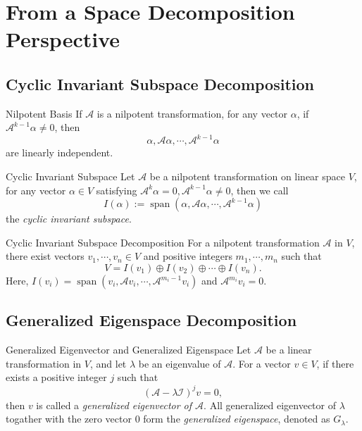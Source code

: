 

\section{From a Space Decomposition Perspective}

\subsection{Cyclic Invariant Subspace Decomposition}

\begin{lemma}{Nilpotent Basis}{}
  If $\mathcal{A}$ is a nilpotent transformation,
  for any vector $\alpha$,
  if $\mathcal{A}^{k-1} \alpha \neq 0$,
  then
  \begin{equation}
    \alpha, \mathcal{A}\alpha,\cdots,\mathcal{A}^{k-1}\alpha
  \end{equation}
  are linearly independent.
\end{lemma}

\begin{definition}{Cyclic Invariant Subspace}{}
  Let $\mathcal{A}$ be a nilpotent transformation on linear space $V$,
  for any vector $\alpha \in V$ satisfying $\mathcal{A}^k \alpha = 0,
  \mathcal{A}^{k-1}\alpha \neq 0$,
  then we call
  \begin{equation}
    I(\alpha) := \operatorname{span}(\alpha, \mathcal{A}\alpha, \cdots, \mathcal{A}^{k-1}\alpha)
  \end{equation}
  the \emph{cyclic invariant subspace}.
\end{definition}

\begin{theorem}{Cyclic Invariant Subspace Decomposition}{}
  For a nilpotent transformation $\mathcal{A}$ in $V$,
  there exist vectors $v_1,\cdots,v_n \in V$ and positive integers
  $m_1,\cdots,m_n$ such that
  \begin{equation}
    V = I(v_1) \oplus I(v_2) \oplus \cdots \oplus I(v_n).
  \end{equation}
  Here, $I(v_i) = \operatorname{span}(v_i, \mathcal{A} v_i, \cdots,
  \mathcal{A}^{m_i - 1}v_i)$ and $\mathcal{A}^{m_i}v_i = 0$.
\end{theorem}

\subsection{Generalized Eigenspace Decomposition}

\begin{definition}{Generalized Eigenvector and Generalized Eigenspace}{}
  Let $\mathcal{A}$ be a linear transformation in $V$,
  and let $\lambda$ be an eigenvalue of $\mathcal{A}$.
  For a vector $v \in V$, if there exists a positive integer $j$ such that
  \begin{equation}
    (\mathcal{A} - \lambda \mathcal{I})^j v = 0,
  \end{equation}
  then $v$ is called a \emph{generalized eigenvector of $\mathcal{A}$}.
  All generalized eigenvector of $\lambda$ togather with the zero vector $0$ form
  the \emph{generalized eigenspace}, denoted as $G_{\lambda}$.
\end{definition}

